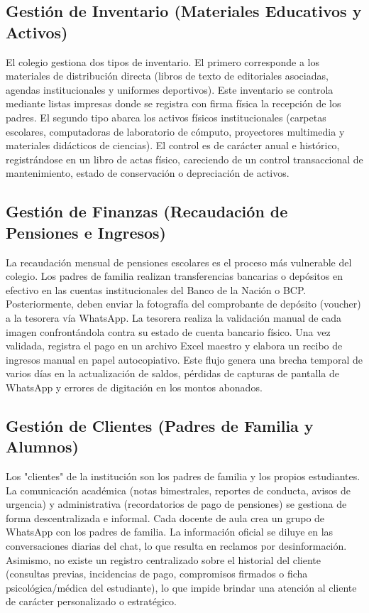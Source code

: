 \documentclass[12pt,a4paper,oneside]{report}
\begin{document}
\subsection{Gestión de Inventario (Materiales Educativos y Activos)}
El colegio gestiona dos tipos de inventario. El primero corresponde a los materiales de distribución directa (libros de texto de editoriales asociadas, agendas institucionales y uniformes deportivos). Este inventario se controla mediante listas impresas donde se registra con firma física la recepción de los padres. El segundo tipo abarca los activos físicos institucionales (carpetas escolares, computadoras de laboratorio de cómputo, proyectores multimedia y materiales didácticos de ciencias). El control es de carácter anual e histórico, registrándose en un libro de actas físico, careciendo de un control transaccional de mantenimiento, estado de conservación o depreciación de activos.

\subsection{Gestión de Finanzas (Recaudación de Pensiones e Ingresos)}
La recaudación mensual de pensiones escolares es el proceso más vulnerable del colegio. Los padres de familia realizan transferencias bancarias o depósitos en efectivo en las cuentas institucionales del Banco de la Nación o BCP. Posteriormente, deben enviar la fotografía del comprobante de depósito (voucher) a la tesorera vía WhatsApp. La tesorera realiza la validación manual de cada imagen confrontándola contra su estado de cuenta bancario físico. Una vez validada, registra el pago en un archivo Excel maestro y elabora un recibo de ingresos manual en papel autocopiativo. Este flujo genera una brecha temporal de varios días en la actualización de saldos, pérdidas de capturas de pantalla de WhatsApp y errores de digitación en los montos abonados.

\subsection{Gestión de Clientes (Padres de Familia y Alumnos)}
Los "clientes" de la institución son los padres de familia y los propios estudiantes. La comunicación académica (notas bimestrales, reportes de conducta, avisos de urgencia) y administrativa (recordatorios de pago de pensiones) se gestiona de forma descentralizada e informal. Cada docente de aula crea un grupo de WhatsApp con los padres de familia. La información oficial se diluye en las conversaciones diarias del chat, lo que resulta en reclamos por desinformación. Asimismo, no existe un registro centralizado sobre el historial del cliente (consultas previas, incidencias de pago, compromisos firmados o ficha psicológica/médica del estudiante), lo que impide brindar una atención al cliente de carácter personalizado o estratégico.
\end{document}
